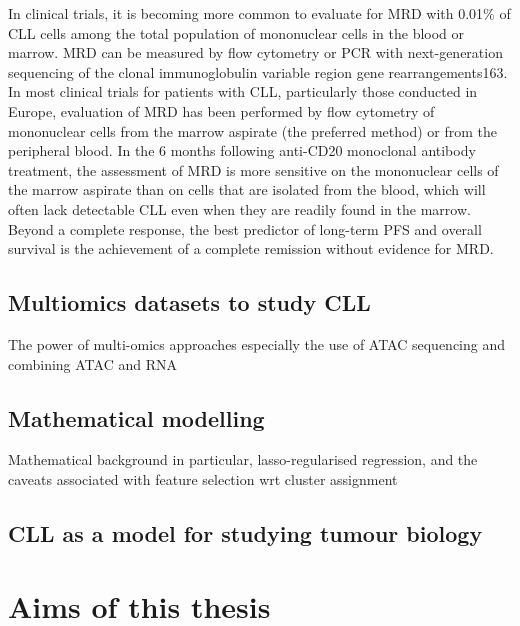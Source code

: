 \documentclass[11pt, a4paper, twosided]{book}
\begin{document}
In clinical trials, it is becoming more common to evaluate for MRD with 0.01\% of CLL cells among the total population of mononuclear cells in the blood or marrow. MRD can be measured by flow cytometry or PCR with next-generation sequencing of the clonal immunoglobulin variable region gene rearrangements163. In most clinical trials for patients with CLL, particularly those conducted in Europe, evaluation of MRD has been performed by flow cytometry of mononuclear cells from the marrow aspirate (the preferred method) or from the peripheral blood. In the 6 months following anti-CD20 monoclonal antibody treatment, the assessment of MRD is more sensitive on the mononuclear cells of the marrow aspirate than on cells that are isolated from the blood, which will often lack detectable CLL even when they are readily found in the marrow. Beyond a complete response, the best predictor of long-term PFS and overall survival is the achievement of a complete remission without evidence for MRD.

\hypertarget{multiomics-datasets-to-study-cll}{%
\subsection{Multiomics datasets to study CLL}\label{multiomics-datasets-to-study-cll}}

The power of multi-omics approaches especially the use of ATAC sequencing and combining ATAC and RNA

\hypertarget{mathematical-modelling}{%
\subsection{Mathematical modelling}\label{mathematical-modelling}}

Mathematical background in particular, lasso-regularised regression, and the caveats associated with feature selection
wrt cluster assignment

\hypertarget{cll-as-a-model-for-studying-tumour-biology}{%
\subsection{CLL as a model for studying tumour biology}\label{cll-as-a-model-for-studying-tumour-biology}}

\hypertarget{aims-of-this-thesis}{%
\section{Aims of this thesis}\label{aims-of-this-thesis}}
\end{document}
